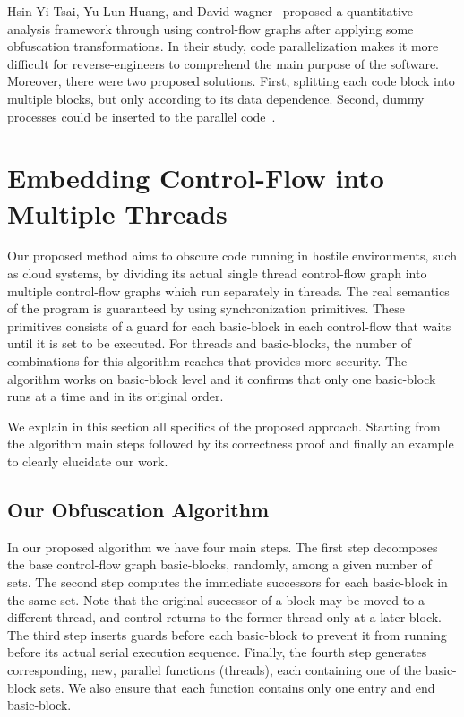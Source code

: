 \documentclass[3p,times,procedia,twocolumn,letterpaper]{elsarticle}
\begin{document}
Hsin-Yi Tsai, Yu-Lun Huang, and David wagner~\cite{r} proposed a quantitative analysis framework through using control-flow graphs after applying some obfuscation transformations. In their study, code parallelization makes it more difficult for reverse-engineers to comprehend the main purpose of the software. Moreover, there were two proposed solutions. First, splitting each code block into multiple blocks, but only according to its data dependence. Second, dummy processes could be inserted to the parallel code~\cite{d}. 



\section{Embedding Control-Flow into Multiple Threads}
\label{method}
Our proposed method aims to obscure code running in hostile environments, such as cloud systems, by
dividing its actual single thread control-flow graph into multiple
control-flow graphs which run separately in threads. The real semantics
of the program is guaranteed by using synchronization
primitives. These primitives consists of a guard for each basic-block
in each control-flow that waits until it is set to be executed. For
 threads and  basic-blocks, the number of combinations for this
algorithm reaches  that provides more security. The algorithm
works on basic-block level and it confirms that only one basic-block
runs at a time and in its original order.


We explain in this section all specifics of the proposed approach. Starting from the algorithm main steps followed by its correctness proof and finally an example to clearly elucidate our work.

\subsection{Our Obfuscation Algorithm}
In our proposed algorithm we have four main steps. The first step decomposes the base control-flow graph basic-blocks, randomly, among a given number of sets. The second  step computes the immediate successors for each basic-block in the same set. Note that the original successor of a block may be moved to a different thread, and control returns to the former thread only at a later block. The third step inserts guards before each basic-block to prevent it from running before its actual serial execution sequence. Finally, the fourth step  generates corresponding, new, parallel functions (threads), each containing one of the basic-block sets. We also ensure that each function contains only one entry and end basic-block. 
\end{document}
